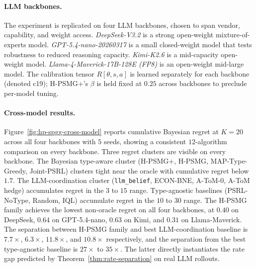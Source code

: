 \documentclass{article}
\def\textsuperscript#1{#1}%
\begin{document}
\paragraph{LLM backbones.} The experiment is replicated on four LLM backbones,
chosen to span vendor, capability, and weight access. \emph{DeepSeek-V3.2} is a
strong open-weight mixture-of-experts model. \emph{GPT-5.4-nano-20260317} is
a small closed-weight model that tests robustness to reduced reasoning capacity.
\emph{Kimi-K2.6} is a mid-capacity open-weight model. \emph{Llama-4-Maverick-17B-128E
(FP8)} is an open-weight mid-large model. The calibration tensor $R[\theta, s, a]$
is learned separately for each backbone (denoted c19); H-PSMG\textsuperscript{+}'s
$\beta$ is held fixed at $0.25$ across backbones to preclude per-model tuning.

\paragraph{Cross-model results.} Figure~\ref{fig:hp-spgg-cross-model} reports
cumulative Bayesian regret at $K = 20$ across all four backbones with $5$ seeds,
showing a consistent $12$-algorithm comparison on every backbone. Three regret
clusters are visible on every backbone. The Bayesian type-aware cluster
(H-PSMG\textsuperscript{+}, H-PSMG, MAP-Type-Greedy, Joint-PSRL) clusters tight
near the oracle with cumulative regret below $1.7$. The LLM-coordination cluster
(\texttt{llm\_belief}, ECON-BNE, A-ToM-0, A-ToM hedge) accumulates regret in the
$3$ to $15$ range. Type-agnostic baselines (PSRL-NoType, Random, IQL) accumulate
regret in the $10$ to $30$ range. The H-PSMG family achieves the lowest
non-oracle regret on all four backbones, at $0.40$ on DeepSeek, $0.64$ on
GPT-5.4-nano, $0.63$ on Kimi, and $0.31$ on Llama-Maverick. The separation
between H-PSMG family and best LLM-coordination baseline is $7.7\times$,
$6.3\times$, $11.8\times$, and $10.8\times$ respectively, and the separation
from the best type-agnostic baseline is $27\times$ to $35\times$. The latter
directly instantiates the rate gap predicted by Theorem~\ref{thm:rate-separation}
on real LLM rollouts.
\end{document}

